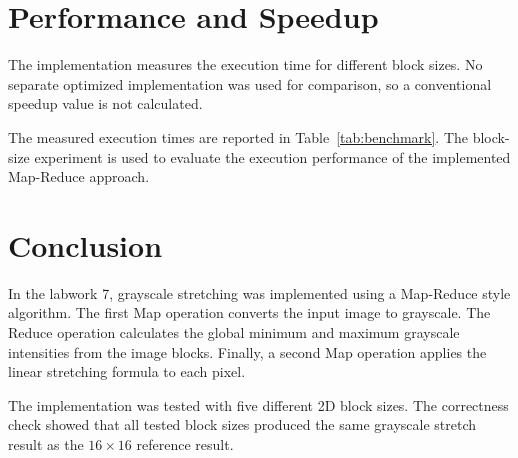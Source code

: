 \documentclass[11pt]{article}
\begin{document}
\section{Performance and Speedup}

The implementation measures the execution time for different block sizes. No separate optimized implementation was used for comparison, so a conventional speedup value is not calculated.

The measured execution times are reported in Table~\ref{tab:benchmark}. The block-size experiment is used to evaluate the execution performance of the implemented Map-Reduce approach.

\section{Conclusion}

In the labwork 7, grayscale stretching was implemented using a Map-Reduce style algorithm. The first Map operation converts the input image to grayscale. The Reduce operation calculates the global minimum and maximum grayscale intensities from the image blocks. Finally, a second Map operation applies the linear stretching formula to each pixel.

The implementation was tested with five different 2D block sizes. The correctness check showed that all tested block sizes produced the same grayscale stretch result as the $16\times16$ reference result.
\end{document}
